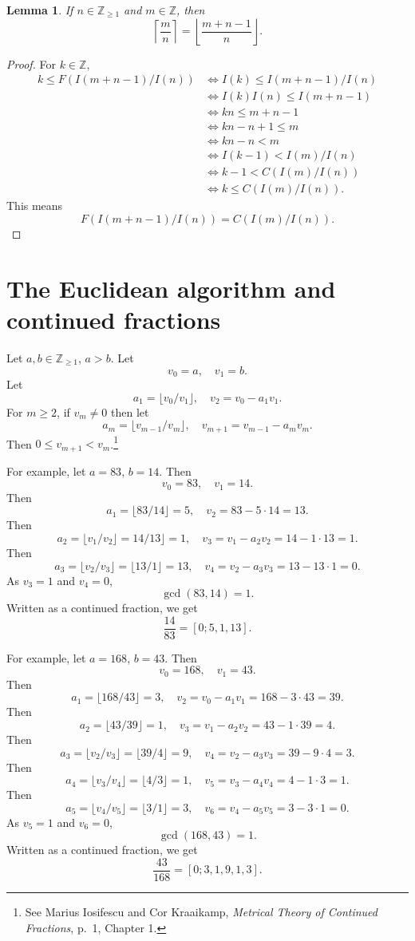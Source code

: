\documentclass{article}
\newtheorem{lemma}[theorem]{Lemma}
\theoremstyle{definition}
\begin{document}
\begin{lemma}
If $n \in \mathbb{Z}_{\geq 1}$ and $m \in \mathbb{Z}$, then
\[
\left\lceil \frac{m}{n} \right\rceil  = \left \lfloor \frac{m+n-1}{n} \right \rfloor.
\]
\end{lemma}
\begin{proof}
For $k \in \mathbb{Z}$,
\begin{align*}
k\leq F(I(m+n-1)/I(n))&\iff I(k) \leq I(m+n-1)/I(n)\\
&\iff I(k) I(n) \leq I(m+n-1)\\
&\iff kn \leq m+n-1\\
&\iff kn-n+1 \leq m\\
&\iff kn-n < m\\
&\iff I(k-1) < I(m)/I(n)\\
&\iff k-1< C(I(m)/I(n))\\
&\iff k \leq C(I(m)/I(n)).
\end{align*}
This means 
\[
F(I(m+n-1)/I(n)) = C(I(m)/I(n)).
\]
\end{proof}




\section{The Euclidean algorithm and continued fractions}
Let $a,b \in \mathbb{Z}_{\geq 1}$, $a > b$. 
Let 
\[
v_0=a, \quad v_1=b.
\]  
Let
\[
a_1=\lfloor v_0/v_1 \rfloor,\quad v_2 = v_0-a_1v_1.
\]
For $m \geq 2$, if $v_m \neq 0$ then let
\[
a_m = \lfloor v_{m-1}/v_m \rfloor,\quad v_{m+1} = v_{m-1} - a_mv_m.
\] 
Then $0 \leq v_{m+1} < v_m$.\footnote{See Marius Iosifescu and Cor Kraaikamp,
{\em Metrical Theory of
Continued Fractions}, p.~1, Chapter 1.}

For example, let $a=83$, $b=14$. Then
\[
v_0=83,\quad v_1=14.
\]
Then 
\[
a_1=\lfloor 83/14 \rfloor = 5,\quad 
v_2 = 83 - 5 \cdot 14 = 13.
\] 
Then
\[
a_2 = \lfloor v_1/v_2 \rfloor = 14/13 \rfloor = 1,\quad 
v_3 = v_1 - a_2 v_2 = 14 - 1 \cdot 13 = 1.
\]
Then
\[
a_3 = \lfloor v_2/v_3 \rfloor = \lfloor 13/1 \rfloor = 13,\quad
v_4 = v_2 - a_3 v_3 = 13 - 13 \cdot 1 = 0.
\]
As $v_3=1$ and $v_4=0$,
\[
\gcd(83,14) = 1.
\]
Written as a continued fraction, we get
\[
\frac{14}{83} = [0;5,1,13].
\]



For example, let $a=168$, $b=43$. Then
\[
v_0=168,\quad v_1=43.
\]
Then
\[
a_1=\lfloor 168/43 \rfloor = 3,\quad
v_2 = v_0- a_1v_1 = 168 - 3 \cdot 43 = 39.
\]
Then
\[
a_2 = \lfloor 43/39 \rfloor = 1,\quad
v_3 = v_1 - a_2 v_2 = 43 - 1 \cdot 39 = 4.
\]
Then
\[
a_3 = \lfloor v_2 / v_3 \rfloor = \lfloor 39/4 \rfloor = 9,\quad
v_4 = v_2 - a_3 v_3 = 39 - 9 \cdot 4 = 3.
\]
Then
\[
a_4 = \lfloor v_3/v_4 \rfloor = \lfloor 4/3 \rfloor = 1,\quad 
v_5 = v_3 - a_4 v_4 = 4 - 1 \cdot 3 = 1.
\]
Then
\[
a_5 = \lfloor v_4/v_5 \rfloor = \lfloor 3/1 \rfloor = 3,\quad
v_6 = v_4 - a_5v_5 = 3 - 3 \cdot 1 = 0.
\]
As $v_5=1$ and $v_6=0$,
\[
\gcd(168,43) = 1.
\]
Written as a continued fraction, we get
\[
\frac{43}{168} = [0;3,1,9,1,3].
\]
\end{document}
